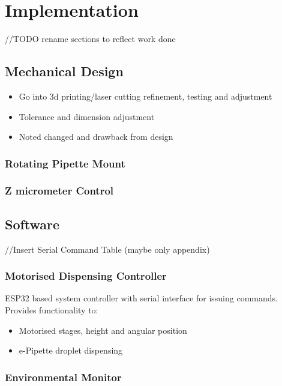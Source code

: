 \chapter{Implementation}\label{C:imp} 


//TODO rename sections to reflect work done
\section{Mechanical Design}

\begin{itemize}
    \item Go into 3d printing/laser cutting refinement, testing and adjustment
    \item Tolerance and dimension adjustment
    \item Noted changed and drawback from design  
\end{itemize}

\subsection{Rotating Pipette Mount}

\subsection{Z micrometer Control}

\section{Software}

//Insert Serial Command Table (maybe only appendix)

\subsection{Motorised Dispensing Controller}
ESP32 based system controller with serial interface for issuing commands. Provides functionality to:
\begin{itemize}
    \item Motorised stages, height and angular position
    \item e-Pipette droplet dispensing 
\end{itemize}

\subsection{Environmental Monitor}

